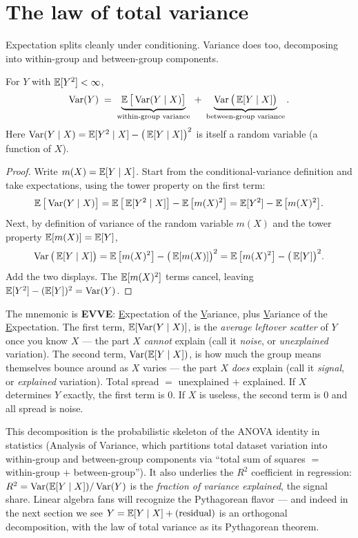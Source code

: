 \section{The law of total variance}
\label{ch15:total-var}

Expectation splits cleanly under conditioning. Variance does too, decomposing into
within-group and between-group components.

\begin{theorem}
\label{ch15:thm-eve}
For $Y$ with $\operatorname{\mathbb{E}}[Y^2] < \infty$,
\[
  \operatorname{Var}(Y) \;=\; \underbrace{\operatorname{\mathbb{E}}\big[\operatorname{Var}(Y\mid X)\big]}_{\text{within-group variance}}
  \;+\; \underbrace{\operatorname{Var}\big(\operatorname{\mathbb{E}}[Y\mid X]\big)}_{\text{between-group variance}}.
\]
Here $\operatorname{Var}(Y\mid X) = \operatorname{\mathbb{E}}[Y^2 \mid X] - \big(\operatorname{\mathbb{E}}[Y\mid X]\big)^2$ is itself a random variable
(a function of $X$).
\end{theorem}

\begin{proof}
Write $m(X) = \operatorname{\mathbb{E}}[Y\mid X]$. Start from the conditional-variance definition and take expectations,
using the tower property on the first term:
\[
  \operatorname{\mathbb{E}}\big[\operatorname{Var}(Y\mid X)\big]
  = \operatorname{\mathbb{E}}\big[\operatorname{\mathbb{E}}[Y^2\mid X]\big] - \operatorname{\mathbb{E}}\big[m(X)^2\big]
  = \operatorname{\mathbb{E}}[Y^2] - \operatorname{\mathbb{E}}\big[m(X)^2\big].
\]
Next, by definition of variance of the random variable $m(X)$ and the tower property
$\operatorname{\mathbb{E}}[m(X)] = \operatorname{\mathbb{E}}[Y]$,
\[
  \operatorname{Var}\big(\operatorname{\mathbb{E}}[Y\mid X]\big) = \operatorname{\mathbb{E}}\big[m(X)^2\big] - \big(\operatorname{\mathbb{E}}[m(X)]\big)^2
  = \operatorname{\mathbb{E}}\big[m(X)^2\big] - \big(\operatorname{\mathbb{E}}[Y]\big)^2.
\]
Add the two displays. The $\operatorname{\mathbb{E}}[m(X)^2]$ terms cancel, leaving
$\operatorname{\mathbb{E}}[Y^2] - (\operatorname{\mathbb{E}}[Y])^2 = \operatorname{Var}(Y)$.
\end{proof}

\begin{intuitionbox}
The mnemonic is \textbf{EVVE}: \underline{E}xpectation of the \underline{V}ariance, plus
\underline{V}ariance of the \underline{E}xpectation. The first term, $\operatorname{\mathbb{E}}[\operatorname{Var}(Y\mid X)]$, is the
\emph{average leftover scatter} of $Y$ once you know $X$ --- the part $X$ \emph{cannot} explain (call it
\emph{noise}, or \emph{unexplained} variation). The second term, $\operatorname{Var}(\operatorname{\mathbb{E}}[Y\mid X])$, is how much the
group means themselves bounce around as $X$ varies --- the part $X$ \emph{does} explain (call it
\emph{signal}, or \emph{explained} variation). Total spread $=$ unexplained $+$ explained. If $X$
determines $Y$ exactly, the first term is $0$. If $X$ is useless, the second term is $0$ and all spread
is noise.
\end{intuitionbox}

\begin{connectionbox}
This decomposition is the probabilistic skeleton of the ANOVA identity in statistics
(Analysis of Variance, which partitions total dataset variation into within-group
and between-group components via ``total sum of squares $=$ within-group $+$
between-group''). It also underlies the $R^2$ coefficient in regression:
$R^2 = \operatorname{Var}(\operatorname{\mathbb{E}}[Y\mid X]) / \operatorname{Var}(Y)$ is the \emph{fraction of variance explained},
the signal share. Linear algebra fans will recognize the Pythagorean flavor --- and indeed in the next
section we see $Y = \operatorname{\mathbb{E}}[Y\mid X] + (\text{residual})$ is an orthogonal decomposition, with the law of
total variance as its Pythagorean theorem.
\end{connectionbox}

